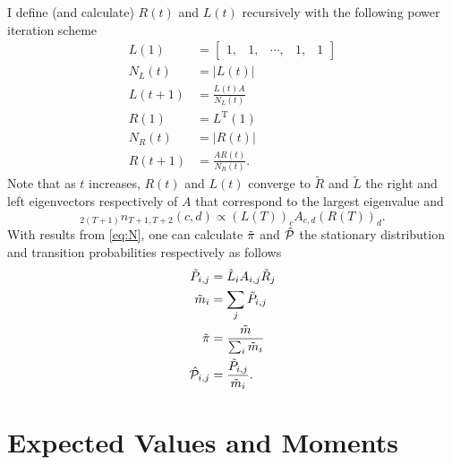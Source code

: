 \documentclass[]{article}
\newcommand{\T}{{\cal P}}
\newcommand{\Td}{\hat \T} %
\begin{document}
I define (and calculate) $R(t)$ and $L(t)$ recursively with the
following power iteration scheme
\begin{align*}
  L(1) &= \begin{bmatrix} 1,&1,&\cdots,&1,&1\end{bmatrix} \\
  N_L(t) &= \left| L(t) \right| \\
  L(t+1) &= \frac{L(t) A}{N_L(t)} \\
  R(1) &= L^{\text{T}}(1) \\
  N_R(t) &= \left| R(t) \right| \\
  R(t+1) &= \frac{A R(t)}{N_R(t)}.
\end{align*}
Note that as $t$ increases, $R(t)$ and $L(t)$ converge to $\tilde R$
and $\tilde L$ the right and left eigenvectors respectively of $A$
that correspond to the largest eigenvalue and
\begin{equation}
  \label{eq:N}
   _{2(T+1)}n_{T+1,T+2}(c,d) \propto \left(L(T)\right)_c  A_{c,d}
   \left(R(T)\right)_d .
\end{equation}
With results from \eqref{eq:N}, one can calculate $\tilde {\pi}$
and $\Td$ the stationary distribution and transition probabilities
respectively as follows
\begin{subequations}
\label{eq:Peig}
  \begin{align}
    \tilde P_{i,j} &= \tilde L_i A_{i,j} \tilde R_j \nonumber \\
    \tilde m_i &= \sum_j \tilde P_{i,j} \nonumber \\
    \tilde \stationary &= \frac{\tilde m}{\sum_i \tilde m_i} \\
    \Td_{i,j} &= \frac{\tilde P_{i,j}}{\tilde m_i}.
  \end{align}
\end{subequations}

\section{Expected Values and Moments}
\label{sec:expected}

\newcommand{\Stationary}{\hat \stationary} %
\newcommand{\Q}{\hat Q} %
\newcommand{\mean}{\mu} %
\end{document}
